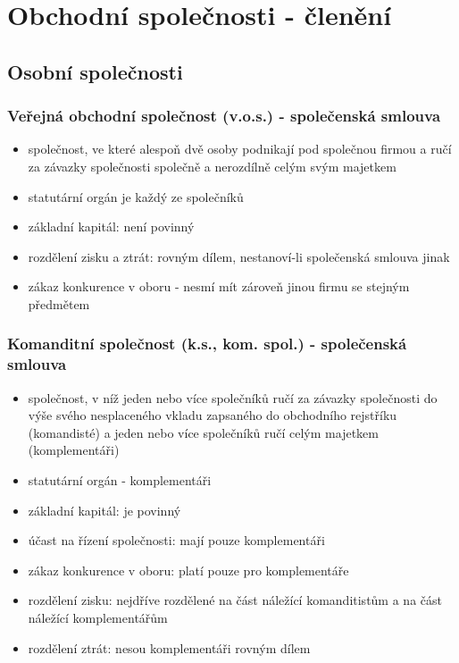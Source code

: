 \documentclass[11pt,a4paper,twoside]{book}
\begin{document}
	\section{Obchodní společnosti - členění}
			\subsection{Osobní společnosti}
				\subsubsection{Veřejná obchodní společnost (v.o.s.) - společenská smlouva}
					\begin{itemize}
						\item společnost, ve které alespoň dvě osoby podnikají pod společnou firmou a ručí za závazky společnosti společně a nerozdílně celým svým majetkem
						\item statutární orgán je každý ze společníků
						\item základní kapitál: není povinný
						\item rozdělení zisku a ztrát: rovným dílem, nestanoví-li společenská smlouva jinak
						\item zákaz konkurence v oboru - nesmí mít zároveň jinou firmu se stejným předmětem
					\end{itemize}
				\subsubsection{Komanditní společnost (k.s., kom. spol.) - společenská smlouva}
					\begin{itemize}
						\item společnost, v níž jeden nebo více společníků ručí za závazky společnosti do výše svého nesplaceného vkladu zapsaného do obchodního rejstříku (komandisté) a jeden nebo více společníků ručí celým majetkem (komplementáři)
						\item statutární orgán - komplementáři
						\item základní kapitál: je povinný
						\item účast na řízení společnosti: mají pouze komplementáři
						\item zákaz konkurence v oboru: platí pouze pro komplementáře
						\item rozdělení zisku: nejdříve rozdělené na část náležící komanditistům a na část náležící komplementářům
						\item rozdělení ztrát: nesou komplementáři rovným dílem
					\end{itemize}
\end{document}
